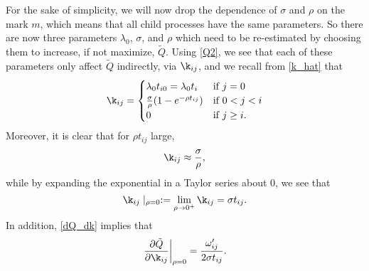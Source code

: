 \documentclass[12pt,leqno]{article}
\begin{document}
For the sake of simplicity, we will now drop the dependence of $\sigma$ and $\rho$ on the mark $m$, which means
that all child processes have the same parameters.  So there are now three parameters $\lambda_0$, $\sigma$, and
$\rho$ which need to be re-estimated by choosing them to increase, if not maximize, $\tilde{Q}$.  
Using \eqref{Q2}, we see that each of these parameters only affect $\tilde{Q}$ indirectly, via $\k_{ij}$, and we recall
from \eqref{k_hat} that
$$
\k_{ij} = \begin{cases}
\lambda_0t_{i0} = \lambda_0t_i & \text{if $j = 0$}\\
\frac{\sigma}{\rho}(1-e^{-\rho{t_{ij}}}) & \text{if $0 < j < i$}\\
0 &\text{if $j\ge i$}.
\end{cases}
$$
Moreover, it is clear that for $\rho{t_{ij}}$ large,
$$
\k_{ij} \approx \frac{\sigma}{\rho},
$$
while by expanding the exponential in a Taylor series about 0, we see that
\begin{equation}\label{k_hat(0)}
\k_{ij}\mid_{\rho=0} := \lim_{\rho\rightarrow{0^+}}\k_{ij} = \sigma{t_{ij}}.
\end{equation}
In addition, \eqref{dQ_dk} implies that
\begin{equation}\label{dQ_dk(0)}
\left.\frac{\partial\tilde{Q}}{\partial\k_{ij}}\right|_{\rho=0} = \frac{\omega'_{ij}}{2\sigma t_{ij}}.
\end{equation}
\end{document}
